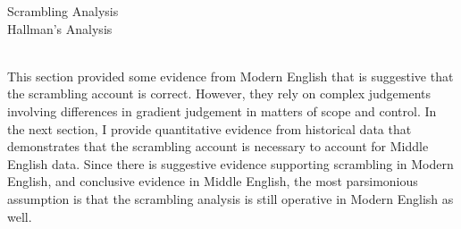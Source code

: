 \documentclass[11pt]{upenndiss}
\begin{document}
\begin{exe}
\ex \label{ex:comparison-trees}
\begin{xlist}
\ex Scrambling Analysis \\
\ex Hallman's Analysis \\
\\
\end{xlist}
\end{exe}%

This section provided some evidence from Modern English that is suggestive that the scrambling account is correct. However, they rely on complex judgements involving differences in gradient judgement in matters of scope and control. In the next section, I provide quantitative evidence from historical data that demonstrates that the scrambling account is necessary to account for Middle English data. Since there is suggestive evidence supporting scrambling in Modern English, and conclusive evidence in Middle English, the most parsimonious assumption is that the scrambling analysis is still operative in Modern English as well.
\end{document}

